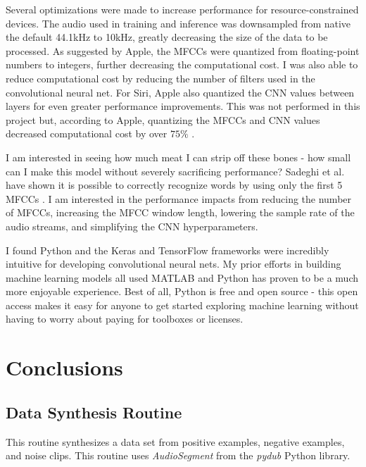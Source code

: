 \documentclass[conference]{IEEEtran}
\begin{document}
Several optimizations were made to increase performance for resource-constrained devices.
The audio used in training and inference was downsampled from native the default 44.1kHz to 10kHz,
greatly decreasing the size of the data to be processed.
As suggested by Apple, the MFCCs were quantized from floating-point numbers to integers,
further decreasing the computational cost.
I was also able to reduce computational cost by reducing the number of filters
used in the convolutional neural net.
For Siri, Apple also quantized the CNN values between layers for even greater performance improvements.
This was not performed in this project but, according to Apple, quantizing the MFCCs and CNN values
decreased computational cost by over $75\%$ \cite{Efficient}.

I am interested in seeing how much meat I can strip off these bones -
how small can I make this model without severely sacrificing performance?
Sadeghi et al. have shown it is possible to correctly recognize words 
by using only the first 5 MFCCs \cite{optimalmfcc}.
I am interested in the performance impacts from reducing the number of MFCCs,
increasing the MFCC window length, lowering the sample rate of the audio streams,
and simplifying the CNN hyperparameters.

I found Python and the Keras and TensorFlow frameworks 
were incredibly intuitive for developing convolutional neural nets.
My prior efforts in building machine learning models all used MATLAB 
and Python has proven to be a much more enjoyable experience.
Best of all, Python is free and open source - this open access
makes it easy for anyone to get started exploring machine learning
without having to worry about paying for toolboxes or licenses.


\section{Conclusions}




\newpage
\onecolumn
{}
\subsection{Data Synthesis Routine}\label{appendix:synthesis}
This routine synthesizes a data set from positive examples, negative examples, and noise clips.
This routine uses \textit{AudioSegment} from the \textit{pydub} Python library.
\end{document}
